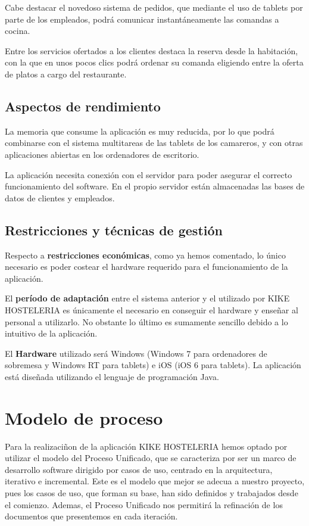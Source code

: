\documentclass[spanish,a4paper,12pt]{report}	%
\begin{document}
Cabe destacar el novedoso sistema de pedidos, que mediante el uso de tablets por parte de los empleados, podrá comunicar instantáneamente las comandas a cocina. 

Entre los servicios ofertados a los clientes destaca la reserva desde la habitación, con la que en unos pocos clics podrá ordenar su comanda eligiendo entre la oferta de platos a cargo del restaurante.



		\subsection{Aspectos de rendimiento}  La memoria que consume la aplicación es muy reducida, por lo que podrá combinarse con el sistema multitareas de las tablets de los camareros, y con otras aplicaciones abiertas en los ordenadores de escritorio.

La aplicación necesita conexión con el servidor para poder asegurar el correcto funcionamiento del software. En el propio servidor están almacenadas las bases de datos de clientes y empleados.


		\subsection{Restricciones y técnicas de gestión}
Respecto a \textbf{restricciones económicas}, como ya hemos comentado, lo único necesario es poder costear el hardware requerido para el funcionamiento de la aplicación.

El \textbf{período de adaptación} entre el sistema anterior y el utilizado por KIKE HOSTELERIA es únicamente el necesario en conseguir el hardware y enseñar al personal a utilizarlo. No obstante lo último es sumamente sencillo debido a lo intuitivo de la aplicación.

El \textbf{Hardware} utilizado será Windows (Windows 7 para ordenadores de sobremesa y Windows RT para tablets) e iOS (iOS 6 para tablets). La aplicación está diseñada utilizando el lenguaje de programación Java.


	\section{Modelo de proceso} Para la realizaciñon de la aplicación KIKE HOSTELERIA hemos optado por utilizar el modelo del Proceso Unificado, que se caracteriza por ser un marco de desarrollo software dirigido por casos de uso, centrado en la arquitectura, iterativo e incremental. Este es el modelo que mejor se adecua a nuestro proyecto, pues los casos de uso, que forman su base, han sido definidos y trabajados desde el comienzo. Ademas, el Proceso Unificado nos permitirá la refinación de los documentos que presentemos en cada iteración.
\end{document}
